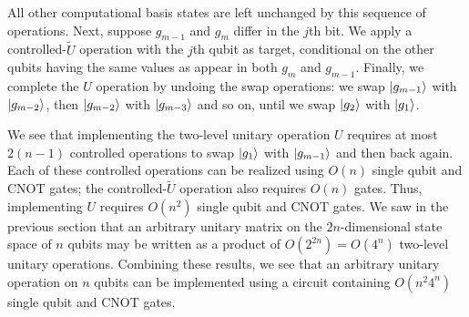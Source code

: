 All other computational basis states are left unchanged by this sequence of operations.
Next, suppose $g_{m−1}$ and $g_m$ differ in the $j$th bit. We apply a controlled-$\widetilde{U}$ operation with the $j$th qubit as target, conditional on the other qubits having the same values as appear in both $g_m$ and $g_{m−1}$. Finally, we complete the $U$ operation by undoing the swap operations: we swap $\ket{g_{m-1}}$ with $\ket{g_{m-2}}$, then $\ket{g_{m-2}}$ with $\ket{g_{m-3}}$ and so on, until we swap $\ket{g_2}$ with $\ket{g_1}$.
\vspace{1em}

We see that implementing the two-level unitary operation $U$ requires at most $2(n−1)$ controlled operations to swap $\ket{g_1}$ with $\ket{g_{m-1}}$ and then back
again. Each of these controlled operations can be realized using $O(n)$ single qubit and CNOT gates; the controlled-$\widetilde{U}$ operation also requires $O(n)$ gates. Thus, implementing $U$ requires $O(n^2)$ single qubit and CNOT gates. We saw in the previous section that an arbitrary unitary matrix on the $2n$-dimensional state space of $n$ qubits may be written as a product of $O(2^{2n}) = O(4^n)$ two-level unitary operations. Combining these results, we see that an arbitrary unitary operation on $n$ qubits can be implemented using a circuit containing $O(n^2 4^n)$ single qubit and CNOT gates. 
